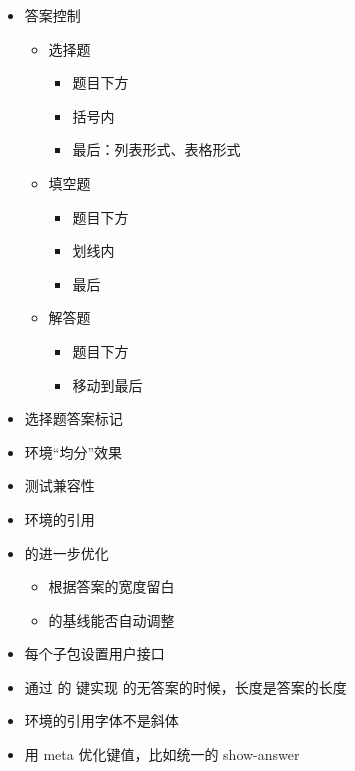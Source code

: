 \documentclass{xdyydoc}
\begin{document}
\begin{itemize}
  \item 答案控制
    \begin{itemize}
      \item 选择题
        \begin{itemize}
          \item 题目下方
          \item 括号内
          \item 最后：列表形式、表格形式
        \end{itemize}
      \item 填空题
        \begin{itemize}
          \item 题目下方
          \item 划线内
          \item 最后
        \end{itemize}
      \item 解答题
        \begin{itemize}
          \item 题目下方
          \item 移动到最后
        \end{itemize}
    \end{itemize}
  \item 选择题答案标记
  \item {} 环境“均分”效果
  \item 测试兼容性
  \item {} 环境的引用
  \item {} 的进一步优化
    \begin{itemize}
      \item 根据答案的宽度留白
      \item {} 的基线能否自动调整
    \end{itemize}
  \item 每个子包设置用户接口
  \item 通过  的  键实现  的无答案的时候，长度是答案的长度
  \item {} 环境的引用字体不是斜体
  \item 用 meta 优化键值，比如统一的 show-answer
\end{itemize}
\end{document}
